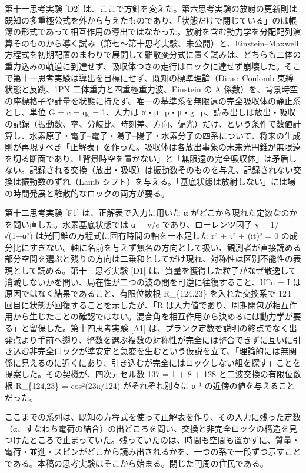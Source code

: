 \documentclass[
  a4paper,
]{ltjsarticle}
\begin{document}
第十一思考実験 {[}D2{]}
は、ここで方針を変えた。第六思考実験の放射の更新則は既知の多重極公式を外から与えたものであり、「状態だけで閉じている」のは帳簿の形式であって相互作用の導出ではなかった。放射を含む動力学を分配配列演算そのものから導く試み（第七〜第十思考実験、未公開）と、Einstein--Maxwell
方程式を初期配置のまわりで展開して離散変分式に置く試みは、どちらも二体の重力込みの軌道に到達せず、吸収体つきの走行はロックに達せず崩壊した。そこで第十一思考実験は導出を目標にせず、既知の標準理論（Dirac--Coulomb
束縛状態と反跳、1PN 二体重力と四重極重力波、Einstein の A
係数）を、背景時空の座標格子や計量を状態に持たず、唯一の基準系を無限遠の完全吸収体の静止系とし、単位
G = c = q₀ = 1、入力は
α・μ\_p・μ・g\_p、読み出しは放出・吸収の記録（振動数、率、分岐比、時刻差、方向、偏光）だけ、という条件で数値計算し、水素原子・電子--電子・陽子--陽子・水素分子の四系について、将来の生成則が再現すべき「正解表」を作った。吸収体は各放出事象の未来光円錐が無限遠を切る断面であり、「背景時空を置かない」と「無限遠の完全吸収体」は矛盾しない。記録される交換（放出・吸収）は振動数そのものを与え、記録されない交換は振動数のずれ（Lamb
シフト）を与える。「基底状態は放射しない」には場の時間発展と離散的なロックの両方が要る。

第十二思考実験 {[}F1{]} は、正解表で入力に用いた α
がどこから現れた定数なのかを問い直した。水素基底状態では α = v/c
であり、ローレンツ因子 γ = 1/√(1−α²)
は光円錐の方程式に固有時間の軸を一本足した r² + τ² + (it)² = 0
の成分比にすぎない。軸に名前を与えず無名の方向として扱い、観測者が直接読める部分空間を選ぶと残りの方向は二乗和としてだけ現れ、対称性は区別不能性の表現として読める。第十三思考実験
{[}D1{]}
は、質量を獲得した粒子がなぜ散逸して消滅しないかを問い、局在性が二つの波の間を可逆に往復すること、U\^{}n
= I は原因ではなく結果であること、有限位数根 R\_\{124,23\}
を入れた交換系で 124 回目に状態が回復することを示したが、「R
は入力値であり、周期閉包が相互作用から生じたことの確認ではない。混合角を相互作用から決めるには動力学が要る」と留保した。第十四思考実験
{[}A1{]}
は、プランク定数を説明の終点でなく出発点より手前へ遡り、整数を選ぶ複数の対称性が完全には整合できずに互いに引き込む非完全ロックが準安定と急変を生むという仮説を立て、「理論的には無関係に見えるのに近くにあり、引き込むが完全にはロックしない組を探す」ことを提案した。その契機が、四次元セル数
137 = 1 + 8 + 128 と二波交換の有限位数根 R\_\{124,23\} = cos²(23π/124)
がそれぞれ別々に α⁻¹ の近傍の値を与えることだった。

ここまでの系列は、既知の方程式を使って正解表を作り、その入力に残った定数（α、すなわち電荷の結合）の出どころを問い、交換と非完全ロックの構造を見つけたところで止まっていた。残っていたのは、時間も空間も置かずに、質量・電荷・並進・スピンがどこから読み出されるかを、一つの系で一段ずつ示すことである。本稿の思考実験はそこから始まる。閉じた円周の住民である。
\end{document}
